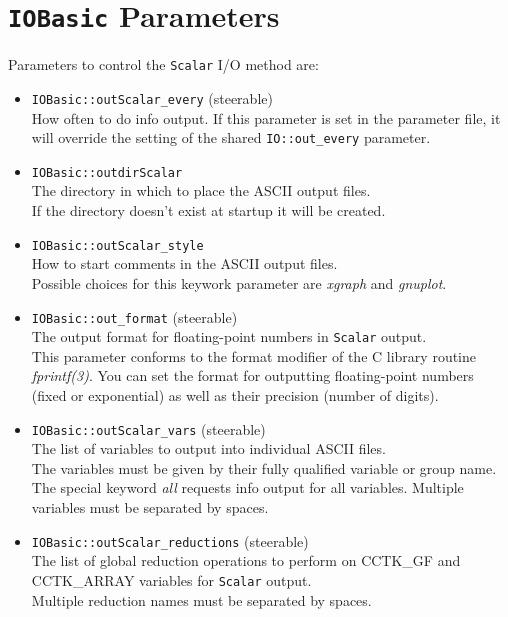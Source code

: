 \documentclass{article}
\begin{document}
\section{{\tt IOBasic} Parameters}
%
Parameters to control the {\tt Scalar} I/O method are:
\begin{itemize}
  \item {\tt IOBasic::outScalar\_every} (steerable)\\
        How often to do info output. If this parameter is set in the
        parameter file, it will override the setting of the shared
        {\tt IO::out\_every} parameter.
  \item {\tt IOBasic::outdirScalar}\\
        The directory in which to place the ASCII output files.\\
        If the directory doesn't exist at startup it will be created.
  \item {\tt IOBasic::outScalar\_style}\\
        How to start comments in the ASCII output files.\\
        Possible choices for this keywork parameter are {\it xgraph} and
        {\it gnuplot}.
  \item {\tt IOBasic::out\_format} (steerable)\\
        The output format for floating-point numbers in {\tt Scalar} output.\\
        This parameter conforms to the format modifier of the C library routine
        {\it fprintf(3)}. You can set the format for outputting floating-point
        numbers (fixed or exponential) as well as their precision (number of
        digits).
  \item {\tt IOBasic::outScalar\_vars} (steerable)\\
        The list of variables to output into individual ASCII files.\\
        The variables must be given by their fully qualified variable or group
        name. The special keyword {\it all} requests info output for all
        variables. Multiple variables must be separated by spaces.
  \item {\tt IOBasic::outScalar\_reductions} (steerable)\\
        The list of global reduction operations to perform on
        CCTK\_GF and CCTK\_ARRAY variables for {\tt Scalar} output.\\
        Multiple reduction names must be separated by spaces.
\end{itemize}
\end{document}
